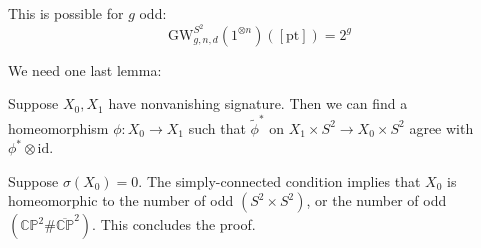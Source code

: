 \begin{lemma}

This is possible for $g$ odd:
\[ \text{GW}^{S^2}_{g,n,d}\left(1^{\otimes n}\right)\left([\text{pt}]\right) =2^g \]

\end{lemma}

We need one last lemma:

\begin{lemma}
    Suppose $X_0, X_1$ have nonvanishing signature. Then we can find a homeomorphism $\phi: X_0 \to X_1$ such that $\tilde{\phi}^*$ on $X_1\times S^2 \to X_0 \times S^2$ agree with $\phi^* \otimes \text{id}$.
\end{lemma}

Suppose $\sigma(X_0)=0$. The simply-connected condition implies that $X_0$ is homeomorphic to the number of odd $(S^2\times S^2)$, or the number of odd $\left(\mathbb{CP}^2 \#\overline{\mathbb{CP}}^2\right)$. This concludes the proof.